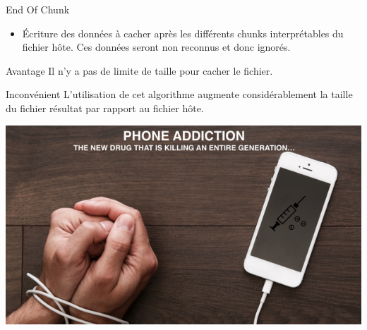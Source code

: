 \documentclass{beamer}
\begin{document}
    \begin{frame}
    
	\begin{block}{End Of Chunk}
	\begin{itemize}
	[circle]
	\item Écriture des données à cacher après les différents chunks interprétables 
	du fichier hôte. Ces données seront non reconnus et donc ignorés.  
	\end{itemize}
	\end{block}
	
	\begin{exampleblock}{Avantage} 
	Il n'y a pas de limite de taille pour cacher le fichier. 
	\end{exampleblock}
	
	\begin{alertblock}{Inconvénient} 
	L'utilisation de cet algorithme augmente considérablement la taille du 
	fichier résultat par rapport au fichier hôte. 
	\end{alertblock}
	
	\hspace{4.3cm}
    \includegraphics[scale=0.08]{ANGS3/addiction.png}
    
    \end{frame}
  
\end{document}
